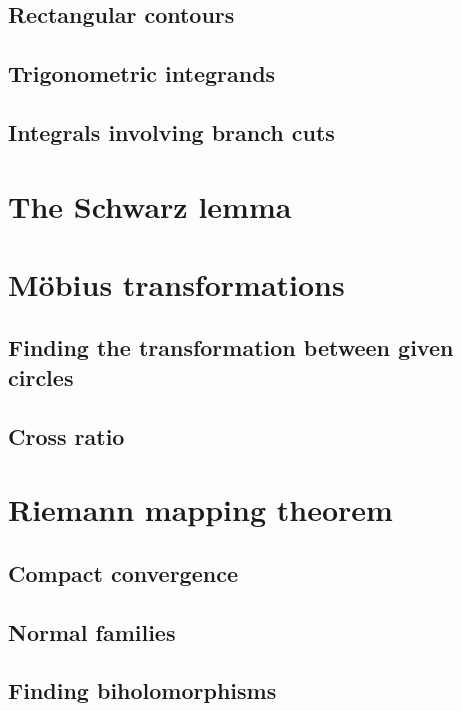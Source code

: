 \subsection{Rectangular contours}

\subsection{Trigonometric integrands}

\subsection{Integrals involving branch cuts}



\section{The Schwarz lemma}


\section{M\"obius transformations}

\subsection{Finding the transformation between given circles}

\subsection{Cross ratio}



\section{Riemann mapping theorem}

\subsection{Compact convergence}

\subsection{Normal families}

\subsection{Finding biholomorphisms}